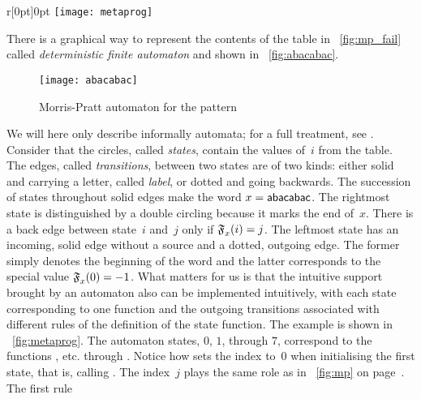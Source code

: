 %
\setlength{\intextsep}{0pt}
\begin{wrapfigure}[29]{r}[0pt]{0pt}
\centering
\texttt{[image: metaprog]}
\caption{Factoring  %
\label{fig:metaprog}}
\end{wrapfigure}
There is a graphical way to represent the contents of the table in
\fig~\vref{fig:mp_fail} called \emph{deterministic finite automaton}
  and shown in
\fig~\vref{fig:abacabac}.
\begin{figure}[b]
\centering
\texttt{[image: abacabac]}
\caption{Morris-Pratt automaton for the pattern 
\label{fig:abacabac}}
\end{figure}
We will here only describe informally automata; for a full treatment,
see \cite{VanLeeuwen_1990c, HopcroftMotwaniUllman_2003,
  Sakarovitch_2003}. Consider that the circles, called
\emph{states}, contain the values of~\(i\) from the
table. The edges, called \emph{transitions}, between
two states are of two kinds: either solid and carrying a letter,
called \emph{label}, or dotted and going backwards. The
succession of states throughout solid edges make the word
\(x=\textsf{abacabac}\). The rightmost state is distinguished by a
double circling because it marks the end of~\(x\). There is a back
edge between state~\(i\) and~\(j\) only if \(\mathfrak{F}_{x}^{}(i) = j\).
The leftmost state has an incoming, solid edge without a source and a
dotted, outgoing edge. The former simply denotes the beginning of the
word and the latter corresponds to the special value
\(\mathfrak{F}_{x}^{}(0) = -1\).  What matters for us is that the
intuitive support brought by an automaton also can be implemented
intuitively, with each state corresponding to one function and the
outgoing transitions associated with different rules of the definition
of the state function. The example  is shown in
\fig~\ref{fig:metaprog}. The automaton states, \(0\), \(1\), through
\(7\), correspond to the functions , 
etc. through . Notice how
 sets the index to~\(0\)
when initialising the first state, that is, calling
. The index~\(j\) plays the same
role as in \fig~\ref{fig:mp} on page~\pageref{fig:mp}. The first rule

